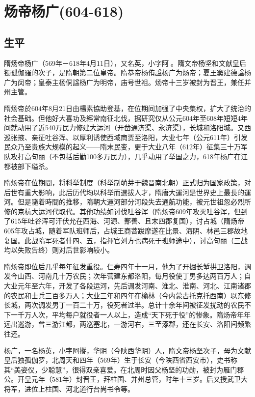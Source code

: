 
\section{炀帝杨广\tiny(604-618)}

\subsection{生平}

隋炀帝杨广（569年－618年4月11日），又名英，小字阿𡡉。隋文帝杨坚和文献皇后獨孤伽羅的次子，是隋朝第二位皇帝。隋恭帝杨侑諡杨广为炀帝；夏王窦建德諡杨广为闵帝；皇泰主杨侗諡杨广为明帝，庙号世祖。炀帝十三岁被封为晋王，兼任并州主管。

隋炀帝於604年8月21日由楊素協助登基，在位期间加强了中央集权，扩大了统治的社会基础。但他好大喜功及經常南征北伐，据研究仅从公元604年至608年短短4年间就动用了近540万民力修建大运河（开凿通济渠、永济渠），长城和洛阳城。又西巡张掖、亲征吐谷浑、以厚利诱使西域商贾至洛阳，大业七年（公元611年）引发民众乃至贵族大规模的起义——隋末民变，更于大业八年（612年）征集三十万军队攻打高句丽（不包括后勤100多万民力），几乎动用了举国之力，618年杨广在江都被部下缢杀。

隋炀帝在位期間，将科举制度（科举制萌芽于魏晋南北朝）正式归为国家政策，对后世有重大影响，此后历代均以科举而選拔人才，隋唐大運河是世界史上最長的運河。但是隨着時間的推移，隋朝大運河部分河段失去通航功能，被元世祖忽必烈所修的京杭大运河代取代。其他功绩如讨伐吐谷浑（隋炀帝609年攻灭吐谷浑，但到了615年吐谷浑可汗伏允在西海、河源、鄯善、且末四郡复国），讨占城（隋炀帝605年攻占城，随着军队班师后，占城王商菩跋摩遂在比景、海阴、林邑三郡故地复国。此战隋军死者什四、五，指揮官刘方也病死于班师途中），讨高句丽（三战均以失败告终）则对后世影响较小。

隋炀帝即位后几乎每年征发重役。仁寿四年十一月，他为了开掘长堑拱卫洛阳，调发今山西、河南几十万农民；次年营建东都洛阳，每月役使丁男多达两百万人；自大业元年至六年，开发了各段运河，先后调发河南、淮北、淮南、河北、江南诸郡的农民和士兵三百多万人；大业三年和四年在榆林（今内蒙古托克托西南）以东修长城，两次调发男丁一百二十万，役死者过半。总计十余年间被征发扰动的农民不下一千万人次，平均每户就役者一人以上，造成“天下死于役”的惨象。隋炀帝年年远出巡游，曾三游江都，两巡塞北，一游河右，三至涿郡，还在长安、洛阳间频繁往还。

杨广，一名杨英，小字阿摐，华阴（今陕西华阴）人，隋文帝杨坚次子，母为文献皇后独孤伽罗，北周天和四年（569年）生于长安（今陕西省西安市），史书称其“美姿仪，少聪慧”，很得双亲喜爱。在北周时因父杨坚的功勋，被封为雁门郡公。开皇元年（581年）封晋王，拜柱国、并州总管，时年十三岁。后又授武卫大将军，进位上柱国、河北道行台尚书令等。

